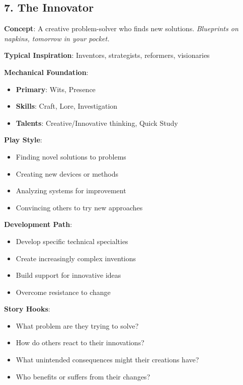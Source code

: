 \begin{multicols}{2}
\section{7. The Innovator}

\textbf{Concept}: A creative problem-solver who finds new solutions. \emph{Blueprints on napkins, tomorrow in your pocket.}

\textbf{Typical Inspiration}: Inventors, strategists, reformers, visionaries

\textbf{Mechanical Foundation}:
\begin{itemize}
\item \textbf{Primary}: Wits, Presence
\item \textbf{Skills}: Craft, Lore, Investigation
\item \textbf{Talents}: Creative/Innovative thinking, Quick Study
\end{itemize}

\textbf{Play Style}:
\begin{itemize}
\item Finding novel solutions to problems
\item Creating new devices or methods
\item Analyzing systems for improvement
\item Convincing others to try new approaches
\end{itemize}

\textbf{Development Path}:
\begin{itemize}
\item Develop specific technical specialties
\item Create increasingly complex inventions
\item Build support for innovative ideas
\item Overcome resistance to change
\end{itemize}

\textbf{Story Hooks}:
\begin{itemize}
\item What problem are they trying to solve?
\item How do others react to their innovations?
\item What unintended consequences might their creations have?
\item Who benefits or suffers from their changes?
\end{itemize}


\end{multicols}
